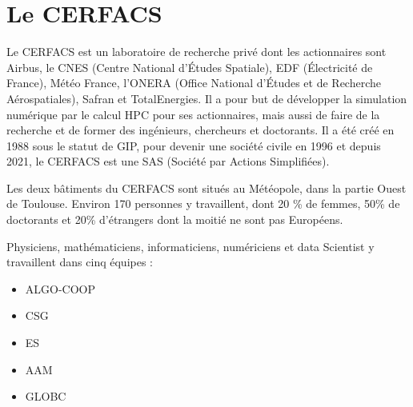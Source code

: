 \chapter{Le CERFACS}


Le CERFACS est un laboratoire de recherche privé dont les actionnaires sont Airbus, le CNES (Centre National d'Études Spatiale), EDF (Électricité de France), Météo France, l'ONERA (Office National d'Études et de Recherche Aérospatiales), Safran et TotalEnergies. Il a pour but de développer la simulation numérique par le calcul HPC pour ses actionnaires, mais aussi de faire de la recherche et de former des ingénieurs, chercheurs et doctorants. Il a été créé en 1988 sous le statut de \ac{GIP}, pour devenir une société civile en 1996 et depuis 2021, le CERFACS est une SAS (Société par Actions Simplifiées).

\vspace{0,5cm}

Les deux bâtiments du CERFACS sont situés au Météopole, dans la partie Ouest de Toulouse. Environ 170 personnes y travaillent, dont 20 \% de femmes, 50\% de doctorants et 20\% d'étrangers dont la moitié ne sont pas Européens.

Physiciens, mathématiciens, informaticiens, numériciens et data Scientist y travaillent dans cinq équipes :


\begin{itemize}
    \item \ac{ALGO-COOP}
    \item \ac{CSG}
    \item \ac{ES}
    \item \ac{AAM}
    \item \ac{GLOBC}
\end{itemize}

\hspace{0,5cm}

